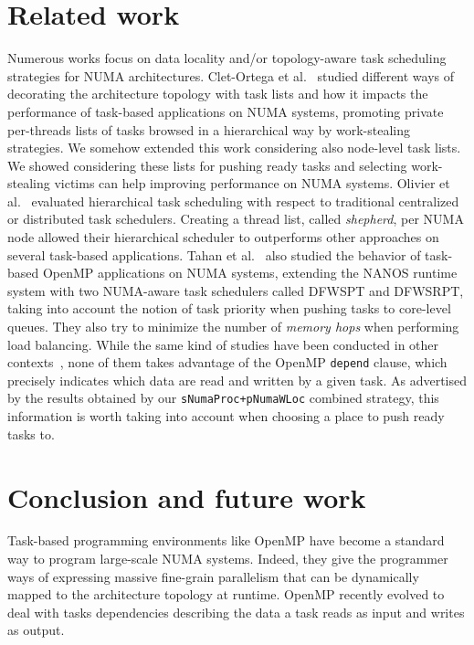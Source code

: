 \documentclass[parallelisme]{compas2016}
\begin{document}
\section{Related work}
\label{sec:related-work}

Numerous works focus on data locality and/or topology-aware task scheduling strategies for
NUMA architectures.
Clet-Ortega et al.~\cite{DBLP:conf/europar/Clet-OrtegaCP14} studied different ways of decorating the architecture topology with task lists and how it impacts the performance of task-based applications on NUMA systems, promoting private per-threads lists of tasks browsed in a hierarchical way by work-stealing strategies.
We somehow extended this work considering also node-level task lists. We showed considering these lists for pushing ready tasks and selecting work-stealing victims can help improving performance on NUMA systems.
Olivier et al.~\cite{DBLP:journals/ijhpca/OlivierPWSP12} evaluated hierarchical task scheduling with respect to traditional centralized or distributed task schedulers. Creating a thread list, called \emph{shepherd}, per NUMA node allowed their hierarchical scheduler to outperforms other approaches on several task-based applications.
Tahan et al.~\cite{DBLP:journals/corr/Tahan14} also studied the behavior of task-based OpenMP applications on NUMA systems, extending the NANOS runtime system with two NUMA-aware task schedulers called DFWSPT and DFWSRPT, taking into account the notion of task priority when pushing tasks to core-level queues. They also try to minimize the number of \emph{memory hops} when performing load balancing.
While the same kind of studies have been conducted in other contexts~\cite{DBLP:conf/europar/TerbovenSCM12,DBLP:journals/corr/abs-1101-0093}, none of them takes advantage of the OpenMP \verb/depend/ clause, which precisely indicates which data are read and written by a given task. As advertised by the results obtained by our \verb!sNumaProc+pNumaWLoc! combined strategy, this information is worth taking into account when choosing a place to push ready tasks to.



\section{Conclusion and future work}
Task-based programming environments like OpenMP have become a standard way to program large-scale NUMA systems.
Indeed, they give the programmer ways of expressing massive fine-grain parallelism that can be dynamically mapped to the architecture topology at runtime.
OpenMP recently evolved to deal with tasks dependencies describing the data a task reads as input and writes as output. 
\end{document}
